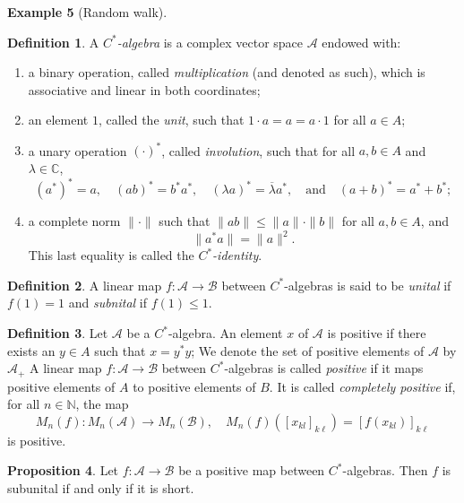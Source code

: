 \documentclass[10pt,a4paper]{amsart}
\theoremstyle{definition}
\newtheorem{definition}{Definition}[section]
\theoremstyle{definition}
\newtheorem{example}[definition]{Example}
\theoremstyle{definition}
\theoremstyle{definition}
\newtheorem{proposition}[definition]{Proposition}
\theoremstyle{definition}
\theoremstyle{definition}
\begin{document}
\begin{example}[Random walk]
\begin{definition}
  A \emph{\( C^* \)-algebra} is a complex vector space \( \mathcal{A} \) endowed with:
\begin{enumerate}
    \item a binary operation, called \emph{multiplication} (and denoted as such), which is associative and linear in both coordinates;
    \item an element \( 1 \), called the \emph{unit}, such that \( 1 \cdot a = a = a \cdot 1 \) for all \( a \in A \);
    \item a unary operation \( (\cdot)^* \), called \emph{involution}, such that for all \( a, b \in A \) and \( \lambda \in \mathbb{C} \),
    \[
    (a^*)^* = a, \quad (ab)^* = b^* a^*, \quad (\lambda a)^* = \overline{\lambda} a^*, \quad \text{and} \quad (a + b)^* = a^* + b^*;
    \]
    \item a complete norm \( \|\cdot\| \) such that \( \| ab \| \leq \|a\| \cdot \|b\| \) for all \( a, b \in A \), and
    \[
    \|a^* a\| = \|a\|^2.
    \]
    This last equality is called the \emph{\( C^* \)-identity}.
\end{enumerate}
\end{definition}



\begin{definition}
A linear map \( f: \mathcal{A} \to \mathcal{B} \) between \( C^* \)-algebras is said to be \emph{unital} if \( f(1) = 1 \) and \emph{subnital} if \( f(1) \leq 1 \).
\end{definition}

\begin{definition}
   Let $\mathcal{A}$ be a \( C^* \)-algebra. An element $x$ of $\mathcal{A}$ is  positive if there exists an $y \in A$ such that $x = y^* y$;
    We denote the set of positive elements of $\mathcal{A}$ by $\mathcal{A}_+$
A linear map \( f: \mathcal{A} \to \mathcal{B} \) between \( C^* \)-algebras is called \emph{positive} if it maps positive elements of $A$ to positive elements of $B$.  
It is called \emph{completely positive} if, for all \( n \in \mathbb{N} \), the map
\[
M_n(f): M_n(\mathcal{A}) \to M_n(\mathcal{B}), \quad M_n(f)\left([x_{kl}]_{k\ell}\right) = \left[f(x_{kl})\right]_{k\ell}
\]
is positive.  
\end{definition}

\begin{proposition} \cite[Proposition 2.4]{choSemanticsQuantumProgramming2016}
Let \( f: \mathcal{A} \to \mathcal{B} \) be a positive map between \( C^* \)-algebras. Then \( f \) is subunital if and only if it is short.
\end{proposition}


\end{example}
\end{document}
